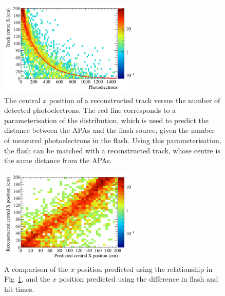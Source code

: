 \begin{figure}
  \centering
  \includegraphics[width=0.6\textwidth]{NumPE_Distance}
  \caption[The central $x$ position of a reconstructed track versus the number of detected photoelectrons]
          {The central $x$ position of a reconstructed track versus the number of detected photoelectrons. The red line corresponds to a parameterisation of the distribution, which is used to predict the distance between the APAs and the flash source, given the number of measured photoelectrons in the flash. Using this parameterisation, the flash can be matched with a reconstructed track, whose centre is the same distance from the APAs.}
  \label{fig:NumPE_Distance}
\end{figure}

\begin{figure}
  \centering
  \includegraphics[width=0.6\textwidth]{DiffFlashPredReco}
  \caption[The predicted $x$ positions of flashes using the relationship between photoelectron and drift distance]
          {A comparison of the $x$ position predicted using the relationship in Fig~\ref{fig:NumPE_Distance}, and the $x$ position predicted using the difference in flash and hit times.}
  \label{fig:PD_PEDiffX}
\end{figure}

